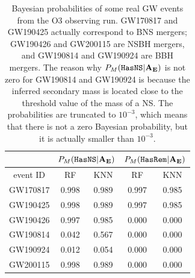 \begin{table}[]
\begin{tabular}{c|cc|cc}
\hline
\multicolumn{1}{c|}{}      & \multicolumn{2}{c|}{$P_M({{\tt HasNS}}|{\bf A}_{\bf E})$}                                                & \multicolumn{2}{c}{$P_M({{\tt HasRem}}|{\bf A}_{\bf E})$}                                                \\ \hline
\multicolumn{1}{c|}{event ID}   & \multicolumn{1}{c}{RF} & \multicolumn{1}{c}{KNN}  & \multicolumn{1}{c}{RF} & \multicolumn{1}{c}{KNN} \\ \hline
GW170817                                   & 0.998                   & 0.989                    & 0.997                   & 0.985                                  \\
GW190425                                   & 0.998                   & 0.989                    & 0.997                   & 0.985                            \\
GW190426                                   & 0.997                   & 0.985                    & 0.000                   & 0.000                     \\
GW190814                                   & 0.042                   & 0.567                   & 0.000                  & 0.000                      \\
GW190924                                   & 0.012                   & 0.054                   & 0.000               & 0.000                       \\               
GW200115                                   & 0.998                   & 0.989                   & 0.000                  & 0.000                           \\
\hline
\end{tabular}
\caption{Bayesian probabilities of some real GW events from the O3 observing run. GW170817 and GW190425 actually correspond to BNS mergers; GW190426 and GW200115 are NSBH mergers, and GW190814 and GW190924 are BBH mergers. The reason why $P_M({{\tt HasNS}}|{\bf A}_{\bf E})$ is not zero for GW190814 and GW190924 is because the inferred secondary mass is located close to the threshold value of the mass of a NS. The probabilities are truncated to $10^{-3}$, which means that there is not a zero Bayesian probability, but it is actually smaller than $10^{-3}$.}
\label{tab:real_data_bayesian}
\end{table}

